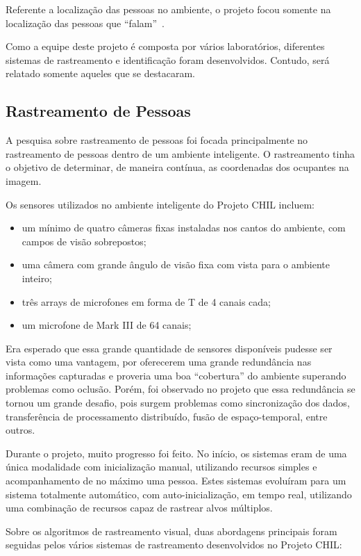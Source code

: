 Referente a localização das pessoas no ambiente, o projeto focou somente na localização das pessoas que ``falam''~\cite{speaker-localization}.

Como a equipe deste projeto é composta por vários laboratórios, diferentes sistemas de rastreamento e identificação foram desenvolvidos. Contudo, será relatado somente aqueles que se destacaram.

\subsection{Rastreamento de Pessoas}

A pesquisa sobre rastreamento de pessoas foi focada principalmente no rastreamento de pessoas dentro de um ambiente inteligente. O rastreamento tinha o objetivo de determinar,  de maneira contínua, as coordenadas dos ocupantes na imagem.

Os sensores utilizados no ambiente inteligente do Projeto CHIL incluem:	
	\begin{itemize}
		\item um mínimo de quatro câmeras fixas instaladas nos cantos do ambiente, com campos de visão sobrepostos;
		\item uma câmera com grande ângulo de visão fixa com vista para o ambiente inteiro;
		\item três arrays de microfones em forma de T de 4 canais cada;
		\item um microfone de Mark III de 64 canais;
	\end{itemize}

Era esperado que essa grande quantidade de sensores disponíveis pudesse ser vista como uma vantagem, por oferecerem uma grande redundância nas informações capturadas e proveria uma boa ``cobertura'' do ambiente superando problemas como oclusão. Porém, foi observado no projeto que essa redundância se tornou um grande desafio, pois surgem problemas como sincronização dos dados, transferência de processamento distribuído, fusão de espaço-temporal, entre outros.

Durante o projeto, muito progresso foi feito. No início, os sistemas eram de uma única modalidade com inicialização manual, utilizando recursos simples e acompanhamento de no máximo uma pessoa. Estes sistemas evoluíram para um sistema totalmente automático, com auto-inicialização, em tempo real, utilizando uma combinação de recursos capaz de rastrear alvos múltiplos.

Sobre os algoritmos de rastreamento visual, duas abordagens principais foram seguidas pelos vários sistemas de rastreamento desenvolvidos no Projeto CHIL:

